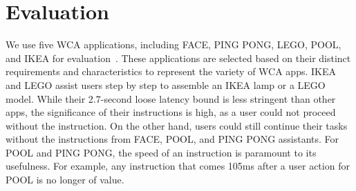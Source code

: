 \section{Evaluation}

We use five WCA applications, including FACE, PING PONG, LEGO, POOL, and IKEA
for evaluation~\cite{chen2017empirical,chen2018application}. These
applications are selected based on their distinct requirements and
characteristics to represent the variety of WCA apps. IKEA and LEGO assist users
step by step to assemble an IKEA lamp or a LEGO model. While their 2.7-second
loose latency bound is less stringent than other apps, the significance of their
instructions is high, as a user could not proceed without the instruction. On
the other hand, users could still continue their tasks without the instructions
from FACE, POOL, and PING PONG assistants. For POOL and PING PONG, the speed of
an instruction is paramount to its usefulness. For example, any instruction that
comes 105ms after a user action for POOL is no longer of value.

